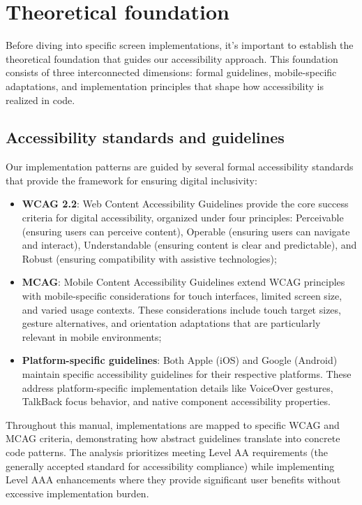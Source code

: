\section{Theoretical foundation}
\label{sec:dev-theoretical-foundation}

Before diving into specific screen implementations, it's important to establish the theoretical foundation that guides our accessibility approach. This foundation consists of three interconnected dimensions: formal guidelines, mobile-specific adaptations, and implementation principles that shape how accessibility is realized in code.

\subsection{Accessibility standards and guidelines}
\label{subsec:dev-standards}

Our implementation patterns are guided by several formal accessibility standards that provide the framework for ensuring digital inclusivity:

\begin{itemize}
    \item \textbf{WCAG 2.2}: Web Content Accessibility Guidelines provide the core success criteria for digital accessibility, organized under four principles: Perceivable (ensuring users can perceive content), Operable (ensuring users can navigate and interact), Understandable (ensuring content is clear and predictable), and Robust (ensuring compatibility with assistive technologies);
    
    \item \textbf{MCAG}: Mobile Content Accessibility Guidelines extend WCAG principles with mobile-specific considerations for touch interfaces, limited screen size, and varied usage contexts. These considerations include touch target sizes, gesture alternatives, and orientation adaptations that are particularly relevant in mobile environments;
    
    \item \textbf{Platform-specific guidelines}: Both Apple (iOS) and Google (Android) maintain specific accessibility guidelines for their respective platforms. These address platform-specific implementation details like VoiceOver gestures, TalkBack focus behavior, and native component accessibility properties.
\end{itemize}

Throughout this manual, implementations are mapped to specific WCAG and MCAG criteria, demonstrating how abstract guidelines translate into concrete code patterns. The analysis prioritizes meeting Level AA requirements (the generally accepted standard for accessibility compliance) while implementing Level AAA enhancements where they provide significant user benefits without excessive implementation burden.

